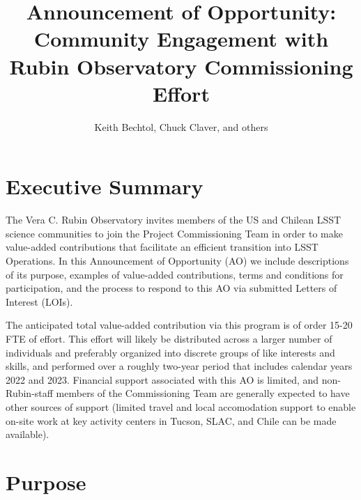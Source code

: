 \documentclass[SE,authoryear,toc]{lsstdoc}
\title{Announcement of Opportunity: Community Engagement with Rubin Observatory Commissioning Effort}
\author{%
Keith Bechtol, Chuck Claver, and others
}
\date{\vcsDate}
\begin{document}
\maketitle


\section{Executive Summary}

The Vera C. Rubin Observatory invites members of the US and Chilean LSST science communities to join the Project Commissioning Team in order to make value-added contributions that facilitate an efficient transition into LSST Operations. In this Announcement of Opportunity (AO) we include descriptions of its purpose, examples of value-added contributions, terms and conditions for participation, and the process to respond to this AO via submitted Letters of Interest (LOIs).

The anticipated total value-added contribution via this program is of order 15-20 FTE of effort. This effort will likely be distributed across a larger number of individuals and preferably organized into discrete groups of like interests and skills, and performed over a roughly two-year period that includes calendar years 2022 and 2023. Financial support associated with this AO is limited, and non-Rubin-staff members of the Commissioning Team are generally expected to have other sources of support (limited travel and local accomodation support to enable on-site work at key activity centers in Tucson, SLAC, and Chile can be made available).

\section{Purpose}
\end{document}
